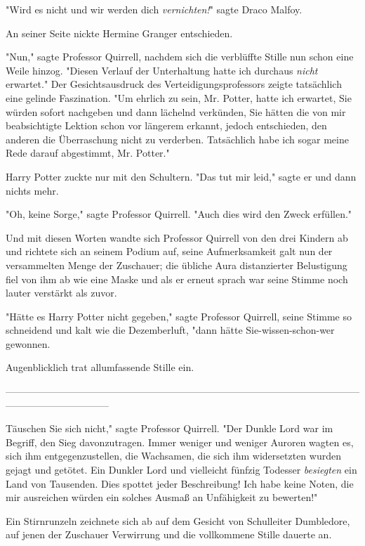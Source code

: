 {"Wird es nicht und wir werden dich \emph{vernichten!}" sagte Draco Malfoy.

An seiner Seite nickte Hermine Granger entschieden.

"Nun," sagte Professor Quirrell, nachdem sich die verblüffte Stille nun schon eine Weile hinzog. "Diesen Verlauf der Unterhaltung hatte ich durchaus \emph{nicht} erwartet." Der Gesichtsausdruck des Verteidigungsprofessors zeigte tatsächlich eine gelinde Faszination. "Um ehrlich zu sein, Mr. Potter, hatte ich erwartet, Sie würden sofort nachgeben und dann lächelnd verkünden, Sie hätten die von mir beabsichtigte Lektion schon vor längerem erkannt, jedoch entschieden, den anderen die Überraschung nicht zu verderben. Tatsächlich habe ich sogar meine Rede darauf abgestimmt, Mr. Potter."

Harry Potter zuckte nur mit den Schultern. "Das tut mir leid," sagte er und dann nichts mehr.

"Oh, keine Sorge," sagte Professor Quirrell. "Auch dies wird den Zweck erfüllen."

Und mit diesen Worten wandte sich Professor Quirrell von den drei Kindern ab und richtete sich an seinem Podium auf, seine Aufmerksamkeit galt nun der versammelten Menge der Zuschauer; die übliche Aura distanzierter Belustigung fiel von ihm ab wie eine Maske und als er erneut sprach war seine Stimme noch lauter verstärkt als zuvor.

"Hätte es Harry Potter nicht gegeben," sagte Professor Quirrell, seine Stimme so schneidend und kalt wie die Dezemberluft, "dann hätte Sie-wissen-schon-wer gewonnen.

Augenblicklich trat allumfassende Stille ein.

--------------------------------------------------------------------------------------------------------------------------------------------

Täuschen Sie sich nicht," sagte Professor Quirrell. "Der Dunkle Lord war im Begriff, den Sieg davonzutragen. Immer weniger und weniger Auroren wagten es, sich ihm entgegenzustellen, die Wachsamen, die sich ihm widersetzten wurden gejagt und getötet. Ein Dunkler Lord und vielleicht fünfzig Todesser \emph{besiegten} ein Land von Tausenden. Dies spottet jeder Beschreibung! Ich habe keine Noten, die mir ausreichen würden ein solches Ausmaß an Unfähigkeit zu bewerten!"

Ein Stirnrunzeln zeichnete sich ab auf dem Gesicht von Schulleiter Dumbledore, auf jenen der Zuschauer Verwirrung und die vollkommene Stille dauerte an.

}

